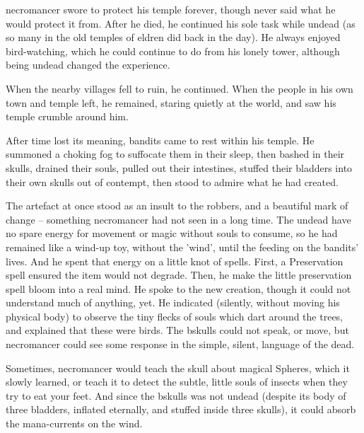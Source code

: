 
\label{necroStory}
\begin{exampletext}
  \noindent
  \Gls{necromancer} swore to protect his temple forever, though never said what he would protect it from.
  After he died, he continued his sole task while undead (as so many in the old temples of \gls{eldren} did back in the day).
  He always enjoyed bird-watching, which he could continue to do from his lonely tower, although being undead changed the experience.

  When the nearby \glspl{village} fell to ruin, he continued.
  When the people in his own town and temple left, he remained, staring quietly at the world, and saw his temple crumble around him.

  After time lost its meaning, bandits came to rest within his temple.
  He summoned a choking fog to suffocate them in their sleep, then bashed in their skulls, drained their souls, pulled out their intestines, stuffed their bladders into their own skulls out of contempt, then stood to admire what he had created.

  The \gls{artefact} at once stood as an insult to the robbers, and a beautiful mark of change -- something \gls{necromancer} had not seen in a long time.
  The undead have no spare energy for movement or magic without souls to consume, so he had remained like a wind-up toy, without the 'wind', until the feeding on the bandits' lives.
  And he spent that energy on a little knot of spells.
  First, a Preservation spell ensured the item would not degrade.
  Then, he make the little preservation spell bloom into a real mind.
  He spoke to the new creation, though it could not understand much of anything, yet.
  He indicated (silently, without moving his physical body) to observe the tiny flecks of souls which dart around the trees, and explained that these were birds.
  The \gls{bskulls} could not speak, or move, but \gls{necromancer} could see some response in the simple, silent, language of the dead.

  Sometimes, \gls{necromancer} would teach the skull about magical Spheres, which it slowly learned, or teach it to detect the subtle, little souls of insects when they try to eat your feet.
  And since the \gls{bskulls} was not undead (despite its body of three bladders, inflated eternally, and stuffed inside three skulls), it could absorb the mana-currents on the wind.


\end{exampletext}
